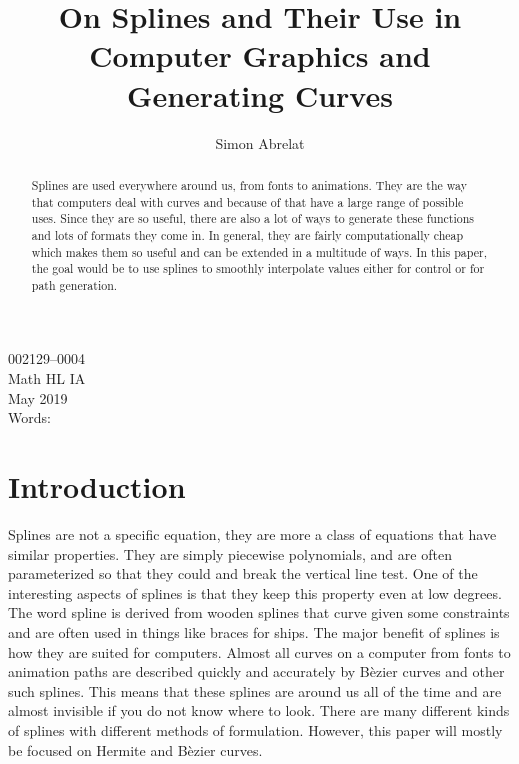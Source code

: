 \documentclass[12pt, letterpaper]{article}
\title{On Splines and Their Use in Computer Graphics and Generating Curves}
\author{Simon Abrelat}
\date{\vspace{-5ex}}
\begin{document}
\large
{\fontsize{12}{14.4}
  {\singlespace{}
  \maketitle
  \begin{center}
  \vspace{4mm}
  002129--0004 \\
  \vspace{4mm}
  Math HL IA \\
  \vspace{4mm}
  May 2019 \\
  \vspace{4mm}
  Words: \\
  \end{center}
  }
}
\newpage

\begin{abstract}
Splines are used everywhere around us, from fonts to animations. They are the way that computers deal with
curves and because of that have a large range of possible uses. Since they are so useful, there are also a
lot of ways to generate these functions and lots of formats they come in. In general, they are fairly
computationally cheap which makes them so useful and can be extended in a multitude of ways. In this paper,
the goal would be to use splines to smoothly interpolate values either for control or for path generation.
\end{abstract}

\newpage
\tableofcontents
\newpage

\section{Introduction}
Splines are not a specific equation, they are more a class of equations that have similar properties. They are
simply piecewise polynomials, and are often parameterized so that they could  and
break the vertical line test. One of the interesting aspects of splines is that they keep this property even
at low degrees. The word spline is derived from wooden splines that curve given some constraints and are often
used in things like braces for ships. The major benefit of splines is how they are suited for computers.
Almost all curves on a computer from fonts to animation paths are described quickly and accurately by
B\`{e}zier curves and other such splines. This means that these splines are around us all of the time and are
almost invisible if you do not know where to look. There are many different kinds of splines with different
methods of formulation. However, this paper will mostly be focused on Hermite and B\`{e}zier curves.
\end{document}
